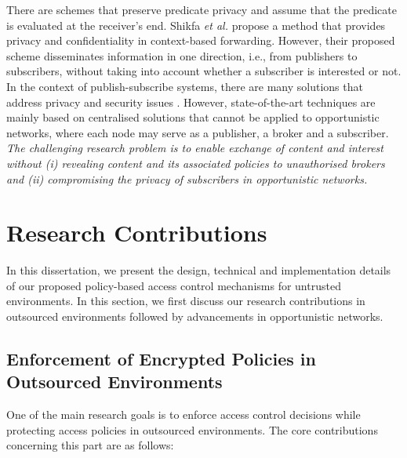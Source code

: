 \documentclass[epsfig,a4paper,11pt,titlepage]{book}
\numberwithin{algorithm}{chapter}
\begin{document}
There are schemes that preserve predicate privacy \cite{Shen:2009, Katz:2013} and assume that the predicate is evaluated at the receiver's end. Shikfa \emph{et al.} \cite{Shikfa:2010} propose a method that provides privacy and confidentiality in context-based forwarding. However, their proposed scheme disseminates information in one direction, i.e., from publishers to subscribers, without taking into account whether a subscriber is interested or not. In the context of publish-subscribe systems, there are many solutions that address privacy and security issues \cite{Choi:2010, Shang:2010, Srivatsa:2007}. However, state-of-the-art techniques are mainly based on centralised solutions that cannot be applied to opportunistic networks, where each node may serve as a publisher, a broker and a subscriber. \emph{The challenging research problem is to enable exchange of content and interest without (i) revealing content and its associated policies to unauthorised brokers and (ii) compromising the privacy of subscribers in opportunistic networks.}

\section{Research Contributions}
In this dissertation, we present the design, technical and implementation details of our proposed policy-based access control mechanisms for untrusted environments. In this section, we first discuss our research contributions in outsourced environments followed by advancements in opportunistic networks.

\subsection{Enforcement of Encrypted Policies in Outsourced Environments}
One of the main research goals is to enforce access control decisions while protecting access policies in outsourced environments. The core contributions concerning this part are as follows:
\end{document}
